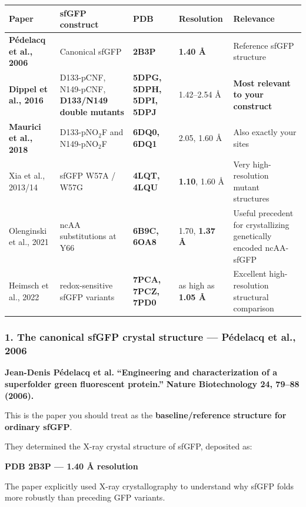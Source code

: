 \documentclass{article}
\begin{document}
\begin{table}[H]\noindent\begin{tabularx}{\linewidth}{LLLLL}
\hline
Paper & sfGFP construct & PDB & Resolution & Relevance \\ \hline
\textbf{Pédelacq et al., 2006} & Canonical sfGFP & \textbf{2B3P} & \textbf{1.40 \AA} & Reference sfGFP structure \\ \hline
\textbf{Dippel et al., 2016} & D133-pCNF, N149-pCNF, \textbf{D133/N149 double mutants} & \textbf{5DPG, 5DPH, 5DPI, 5DPJ} & 1.42--2.54 \AA & \textbf{Most relevant to your construct} \\ \hline
\textbf{Maurici et al., 2018} & D133-pNO\(_2\)F and N149-pNO\(_2\)F & \textbf{6DQ0, 6DQ1} & 2.05, 1.60 \AA & Also exactly your sites \\ \hline
Xia et al., 2013/14 & sfGFP W57A / W57G & \textbf{4LQT, 4LQU} & \textbf{1.10}, 1.60 \AA & Very high-resolution mutant structures \\ \hline
Olenginski et al., 2021 & ncAA substitutions at Y66 & \textbf{6B9C, 6OA8} & 1.70, \textbf{1.37 \AA} & Useful precedent for crystallizing genetically encoded ncAA-sfGFP \\ \hline
Heimsch et al., 2022 & redox-sensitive sfGFP variants & \textbf{7PCA, 7PCZ, 7PD0} & as high as \textbf{1.05 \AA} & Excellent high-resolution structural comparison \\ \hline
\end{tabularx}\end{table}

\subsubsection*{1. The canonical sfGFP crystal structure --- Pédelacq et al., 2006}

\textbf{Jean-Denis Pédelacq et al.}
\textbf{``Engineering and characterization of a superfolder green fluorescent protein.''}
\textbf{Nature Biotechnology 24, 79--88 (2006).}

This is the paper you should treat as the \textbf{baseline/reference structure for ordinary sfGFP}.

They determined the X-ray crystal structure of sfGFP, deposited as:

\textbf{PDB 2B3P --- 1.40 \AA{} resolution}

The paper explicitly used X-ray crystallography to understand why sfGFP folds more robustly than preceding GFP variants. \href{https://www.nature.com/articles/nbt1172}{\textbullet}
\end{document}
